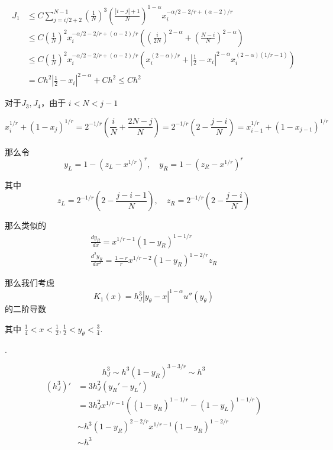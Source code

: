 \documentclass{ctexart}
\begin{document}
\begin{equation}
    \begin{aligned}
        J_1 & \le C \sum_{j=i/2+2}^{N-1} \left(\frac{1}{N}\right)^3 \left(\frac{|i-j|+1}{N}\right)^{1-\alpha} x_i^{-\alpha/2-2/r+(\alpha-2)/r}                   \\
            & \le C  \left(\frac{1}{N}\right)^2 x_i^{-\alpha/2-2/r+(\alpha-2)/r} (\left(\frac{i}{2N}\right)^{2-\alpha} + \left(\frac{N-i}{N}\right)^{2-\alpha} ) \\
            & \le C \left(\frac{1}{N}\right)^2 x_i^{-\alpha/2-2/r+(\alpha-2)/r} (x_i^{(2-\alpha)/r} + |\frac{1}{2}-x_i|^{2-\alpha} x_i^{(2-\alpha)(1/r-1)} )     \\
            & = C h^2 |\frac{1}{2}-x_i|^{2-\alpha} + Ch^2 \le C h^2
    \end{aligned}
\end{equation}

对于\(J_3,J_4\)，由于 \(i<N<j-1\)

\begin{equation}
    x_i^{1/r} + (1-x_j)^{1/r} = 2^{-1/r} (\frac{i}{N} + \frac{2N-j}{N}) = 2^{-1/r} (2-\frac{j-i}{N}) = x_{i-1}^{1/r} + (1-x_{j-1})^{1/r}
\end{equation}

那么令
\begin{equation}
    y_L = 1 - (z_L - x^{1/r})^{r}, \quad y_R = 1 - (z_R - x^{1/r})^{r}
\end{equation}

其中
\begin{equation}
    z_L = 2^{-1/r} (2-\frac{j-i-1}{N}), \quad z_R = 2^{-1/r} (2-\frac{j-i}{N})
\end{equation}

那么类似的
\begin{gather}
    \frac{d y_R}{dx} = x^{1/r-1} (1-y_R)^{1-1/r}    \\
    \frac{d^2 y_R}{dx^2} = \frac{1-r}{r} x^{1/r-2} (1-y_R)^{1-2/r}z_R
\end{gather}

那么我们考虑
\begin{equation}
    K_1(x) = h_J^3 |y_\theta-x|^{1-\alpha} u''(y_\theta)
\end{equation}
的二阶导数

其中 \(\frac{1}{4}< x< \frac{1}{2}, \frac{1}{2} < y_\theta <\frac{3}{4}\).

.

\begin{equation}
    h_J^3 \sim h^3 (1-y_R)^{3-3/r} \sim h^3
\end{equation}
\begin{equation}
    \begin{aligned}
        (h_J^3)' & = 3 h_J^2 (y_R' - y_L ')                               \\
                 & = 3 h_J^2 x^{1/r-1}((1-y_R)^{1-1/r} - (1-y_L)^{1-1/r}) \\
                 & \sim h^3 (1-y_R)^{2-2/r} x^{1/r-1} (1-y_R)^{1-2/r}     \\
                 & \sim h^3
    \end{aligned}
\end{equation}
\end{document}
